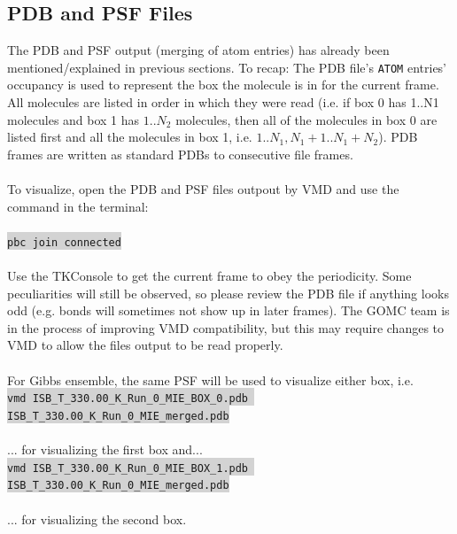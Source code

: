 \subsection{PDB and PSF Files}
The PDB and PSF output (merging of atom entries) has already been mentioned/explained in previous sections.  To recap: The PDB file's \texttt{ATOM} entries' occupancy is used to represent the box the molecule is in for the current frame. All molecules are listed in order in which they were read (i.e. if box 0 has 1..N1 molecules and box 1 has $1..N_2$ molecules, then all of the molecules in box 0 are listed first and all the molecules in box 1, i.e. $1..N_1, N_1+1..N_1+N_2$).  PDB frames are written as standard PDBs to consecutive file frames.\\\\
To visualize, open the PDB and PSF files outpout by VMD and use the command in the terminal:\\\\
\colorbox{lightgray}{
\texttt{pbc join connected}
}\\\\
Use the TKConsole to get the current frame to obey the periodicity. Some peculiarities will still be observed, so please review the PDB file if anything looks odd (e.g. bonds will sometimes not show up in later frames). The GOMC team is in the process of improving VMD compatibility, but this may require changes to VMD to allow the files output to be read properly.\\\\
For Gibbs ensemble, the same PSF will be used to visualize either box, i.e.\\
\colorbox{lightgray}{
\texttt{vmd ISB\_T\_330.00\_K\_Run\_0\_MIE\_BOX\_0.pdb ISB\_T\_330.00\_K\_Run\_0\_MIE\_merged.pdb}
}\\\\
... for visualizing the first box and...\\
\colorbox{lightgray}{
\texttt{vmd ISB\_T\_330.00\_K\_Run\_0\_MIE\_BOX\_1.pdb ISB\_T\_330.00\_K\_Run\_0\_MIE\_merged.pdb}
}\\\\
... for visualizing the second box.
